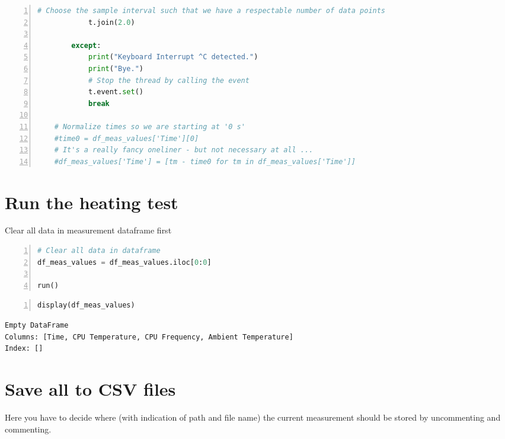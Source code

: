 \documentclass[10pt,parskip=half,
toc=sectionentrywithdots,
bibliography=totocnumbered,
captions=tableheading,numbers=noendperiod]{scrartcl}
\begin{document}
\begin{codecell}[H]
\begin{lstlisting}[language=Python,numbers=left,xleftmargin=20pt,xrightmargin=5pt,belowskip=5pt,aboveskip=5pt]
            # Choose the sample interval such that we have a respectable number of data points
            t.join(2.0)

        except:
            print("Keyboard Interrupt ^C detected.")
            print("Bye.")
            # Stop the thread by calling the event
            t.event.set()
            break

    # Normalize times so we are starting at '0 s'
    #time0 = df_meas_values['Time'][0]
    # It's a really fancy oneliner - but not necessary at all ...
    #df_meas_values['Time'] = [tm - time0 for tm in df_meas_values['Time']]
\end{lstlisting}\end{codecell}

\hypertarget{run-the-heating-test}{%
\section{Run the heating test}\label{run-the-heating-test}}

\begin{codecell}[H]
\caption{Clear all data in measurement dataframe first}
\label{code:df_meas_clear}
\begin{lstlisting}[language=Python,numbers=left,xleftmargin=20pt,xrightmargin=5pt,belowskip=5pt,aboveskip=5pt]
# Clear all data in dataframe
df_meas_values = df_meas_values.iloc[0:0]

run()
\end{lstlisting}\end{codecell}

\begin{lstlisting}[language=Python,numbers=left,xleftmargin=20pt,xrightmargin=5pt,belowskip=5pt,aboveskip=5pt]
display(df_meas_values)
\end{lstlisting}

\begin{lstlisting}[language={},postbreak={},numbers=none,xrightmargin=7pt,breakindent=0pt,aboveskip=5pt,belowskip=5pt]
Empty DataFrame
Columns: [Time, CPU Temperature, CPU Frequency, Ambient Temperature]
Index: []
\end{lstlisting}

\hypertarget{save-all-to-csv-files}{%
\section{Save all to CSV files}\label{save-all-to-csv-files}}

Here you have to decide where (with indication of path and file name)
the current measurement should be stored by uncommenting and commenting.
\end{document}
